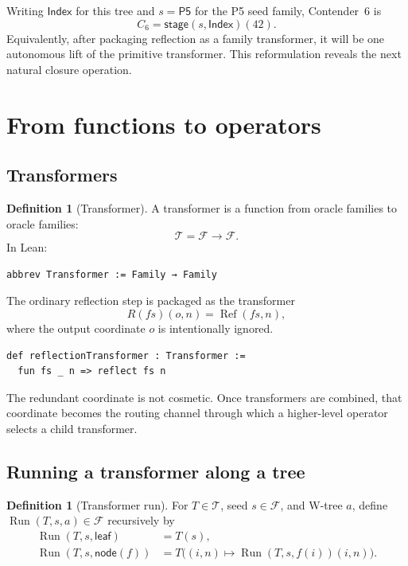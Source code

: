 \documentclass[11pt]{article}
\theoremstyle{definition}
\newtheorem{definition}[theorem]{Definition}
\theoremstyle{remark}
\newcommand{\Fam}{\mathcal{F}}
\newcommand{\Trans}{\mathcal{T}}
\newcommand{\Run}{\operatorname{Run}}
\newcommand{\Refl}{\operatorname{Ref}}
\newcommand{\Index}{\mathsf{Index}}
\newcommand{\Pfive}{\mathsf{P5}}
\begin{document}
Writing \(\Index\) for this tree and \(s=\Pfive\) for the P5 seed family,
Contender~6 is
\[
  C_6 = \mathsf{stage}(s,\Index)(42).
\]
Equivalently, after packaging reflection as a family transformer, it will be
one autonomous lift of the primitive transformer.  This reformulation reveals
the next natural closure operation.

\section{From functions to operators}
\label{sec:operators}

\subsection{Transformers}

\begin{definition}[Transformer]
A transformer is a function from oracle families to oracle families:
\[
  \Trans = \Fam\to\Fam.
\]
In Lean:
\begin{lstlisting}
abbrev Transformer := Family → Family
\end{lstlisting}
\end{definition}

The ordinary reflection step is packaged as the transformer
\[
  R(fs)(o,n)=\Refl(fs,n),
\]
where the output coordinate \(o\) is intentionally ignored.
\begin{lstlisting}
def reflectionTransformer : Transformer :=
  fun fs _ n => reflect fs n
\end{lstlisting}
The redundant coordinate is not cosmetic.  Once transformers are combined,
that coordinate becomes the routing channel through which a higher-level
operator selects a child transformer.

\subsection{Running a transformer along a tree}

\begin{definition}[Transformer run]
For \(T\in\Trans\), seed \(s\in\Fam\), and W-tree \(a\), define
\(\Run(T,s,a)\in\Fam\) recursively by
\[
\begin{aligned}
  \Run(T,s,\mathsf{leaf})
    &=T(s),\\
  \Run(T,s,\mathsf{node}(f))
    &=T\bigl((i,n)\mapsto \Run(T,s,f(i))(i,n)\bigr).
\end{aligned}
\]
\end{definition}
\end{document}
